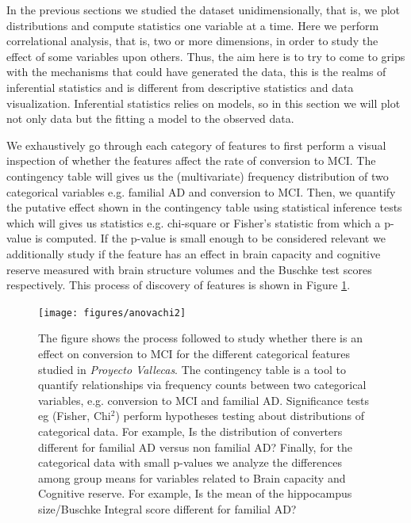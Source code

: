 \documentclass[11pt]{article}
\theoremstyle{definition}
\theoremstyle{remark}
\begin{document}
In the previous sections we studied the dataset unidimensionally, that is, we plot distributions and compute statistics one variable at a time. Here we perform correlational analysis, that is, two or more dimensions, in order to study the effect of some variables upon others. Thus, the aim here is to try to come to grips with the mechanisms that could have generated the data, this is the realms of inferential statistics and is different from descriptive statistics and data visualization. Inferential statistics relies on models, so in this section we will plot not only data but the fitting a model to the observed data.

We exhaustively go through each category of features to first perform a visual inspection of whether the features affect the rate of conversion to MCI. The contingency table will gives us the (multivariate) frequency distribution of two categorical variables e.g. familial AD and conversion to MCI. Then, we quantify the putative effect shown in the contingency table  using statistical inference tests which will gives us statistics e.g. chi-square or Fisher's statistic from which a p-value is computed. If the p-value is small enough to be considered relevant we additionally study if the feature has an effect in brain capacity and cognitive reserve measured with brain structure volumes and the Buschke test scores respectively.
This process of discovery of features is shown in Figure \ref{fig:anovachi}.


\begin{figure}[H]
        \centering
        \texttt{[image: figures/anovachi2]}
        \caption{The figure shows the process followed to study whether there is an effect on conversion to MCI for the different categorical features studied in \emph{Proyecto Vallecas}. The contingency table is a tool to quantify relationships via frequency counts between two categorical variables, e.g. conversion to MCI and familial AD. Significance tests eg (Fisher, Chi$^2$) perform hypotheses testing about distributions of categorical data. For example, Is the distribution of converters different for familial AD versus non familial AD? Finally, for the categorical data with small p-values we analyze the differences among group means for variables related to Brain capacity and Cognitive reserve. For example, Is the mean of the hippocampus size/Buschke Integral score different for familial AD?
        } 
        \label{fig:anovachi}
\end{figure}
\end{document}
